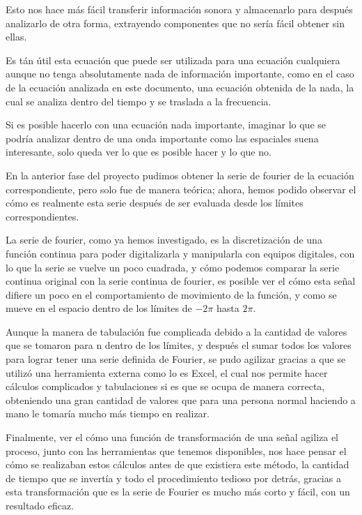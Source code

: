 Esto nos hace más fácil transferir información sonora y almacenarlo para después analizarlo de otra forma, extrayendo componentes que no sería fácil obtener sin ellas.

Es tán útil esta ecuación que puede ser utilizada para una ecuación cualquiera aunque no tenga absolutamente nada de información importante, como en el caso de la ecuación analizada en este documento, una ecuación obtenida de la nada, la cual se analiza dentro del tiempo y se traslada a la frecuencia.

Si es posible hacerlo con una ecuación nada importante, imaginar lo que se podría analizar dentro de una onda importante como las espaciales suena interesante, solo queda ver lo que es posible hacer y lo que no.

En la anterior fase del proyecto pudimos obtener la serie de fourier de la ecuación correspondiente, pero solo fue de manera teórica; ahora, hemos podido observar el cómo es realmente esta serie después de ser evaluada desde los límites correspondientes.

La serie de fourier, como ya hemos investigado, es la discretización de una función continua para poder digitalizarla y manipularla con equipos digitales, con lo que la serie se vuelve un poco cuadrada, y cómo podemos comparar la serie continua original con la serie continua de fourier, es posible ver el cómo esta señal difiere un poco en el comportamiento de movimiento de la función, y como se mueve en el espacio dentro de los límites de \(-2 \pi\) hasta \(2 \pi\).

Aunque la manera de tabulación fue complicada debido a la cantidad de valores que se tomaron para n dentro de los límites, y después el sumar todos los valores para lograr tener una serie definida de Fourier, se pudo agilizar gracias a que se utilizó una herramienta externa como lo es Excel, el cual nos permite hacer cálculos complicados y tabulaciones si es que se ocupa de manera correcta, obteniendo una gran cantidad de valores que para una persona normal haciendo a mano le tomaría mucho más tiempo en realizar.

Finalmente, ver el cómo una función de transformación de una señal agiliza el proceso, junto con las herramientas que tenemos disponibles, nos hace pensar el cómo se realizaban estos cálculos antes de que existiera este método, la cantidad de tiempo que se invertía y todo el procedimiento tedioso por detrás, gracias a esta transformación que es la serie de Fourier es mucho más corto y fácil, con un resultado eficaz.


